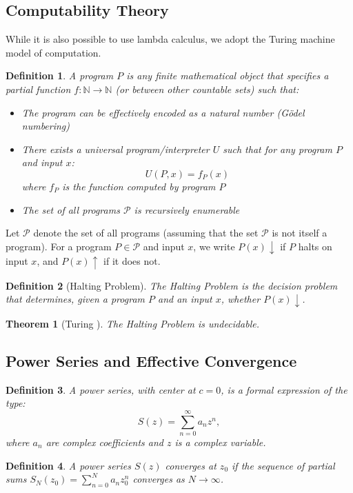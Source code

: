 \documentclass[12pt, a4paper]{article}
\newtheorem{theorem}{Theorem}
\newtheorem{definition}{Definition}
\begin{document}
\subsection{Computability Theory}
While it is also possible to use lambda calculus, we adopt the Turing machine model of computation. 
\begin{definition}
A program $P$ is any finite mathematical object that specifies a partial function $f: \mathbb{N} \to \mathbb{N}$ (or between other countable sets) such that:
\begin{itemize}
\item The program can be effectively encoded as a natural number (Gödel numbering)
\item There exists a universal program/interpreter $U$ such that for any program $P$ and input $x$:
\[
U(P, x) = f_P(x)
\]
where $f_P$ is the function computed by program $P$
\item The set of all programs $\mathcal{P}$ is recursively enumerable
\end{itemize}
\end{definition}
Let $\mathcal{P}$ denote the set of all programs (assuming that the set $\mathcal{P}$ is not itself a program). For a program $P \in \mathcal{P}$ and input $x$, we write $P(x)\downarrow$ if $P$ halts on input $x$, and $P(x)\uparrow$ if it does not.

\begin{definition}[Halting Problem]
The Halting Problem is the decision problem that determines, given a program $P$ and an input $x$, whether $P(x)\downarrow$.
\end{definition}

\begin{theorem}[Turing \cite{turing1936computable}]
The Halting Problem is undecidable.
\end{theorem}

\subsection{Power Series and Effective Convergence}

\begin{definition} A power series, with center at $c=0$, is a formal expression of the type:
\[
S(z) = \sum_{n=0}^{\infty} a_n z^n,
\]
where $a_n$ are complex coefficients and $z$ is a complex variable.
\end{definition}

\begin{definition} A power series $S(z)$ \emph{converges} at $z_0$ if the sequence of partial sums $S_N(z_0) = \sum_{n=0}^{N} a_n z_0^n$ converges as $N \to \infty$.
\end{definition}
\end{document}
